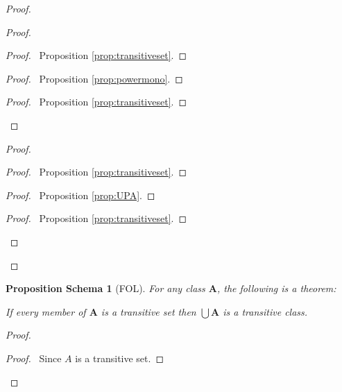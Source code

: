\documentclass{book}
\let\qed\relax
\newtheorem{props}[ax]{Proposition Schema}
\theoremstyle{definition}
\begin{document}
\begin{proof}
\pf
{}
\begin{proof}
	\begin{proof}
		\pf\ Proposition \ref{prop:transitiveset}.
	\end{proof}
	\begin{proof}
		\pf\ Proposition \ref{prop:powermono}.
	\end{proof}
	\begin{proof}
		\pf\ Proposition \ref{prop:transitiveset}.
	\end{proof}
\end{proof}
\begin{proof}
	\begin{proof}
		\pf\ Proposition \ref{prop:transitiveset}.
	\end{proof}
	\begin{proof}
		\pf\ Proposition \ref{prop:UPA}.
	\end{proof}
	\begin{proof}
		\pf\ Proposition \ref{prop:transitiveset}.
	\end{proof}
\end{proof}
\qed
\end{proof}

\begin{props}[FOL]
For any class $\mathbf{A}$, the following is a theorem:

If every member of $\mathbf{A}$ is a transitive set then $\bigcup \mathbf{A}$ is a transitive class.
\end{props}

\begin{proof}
\pf
{}
\begin{proof}
	\pf\ Since $A$ is a transitive set.
\end{proof}
\qed
\end{proof}
\end{document}
